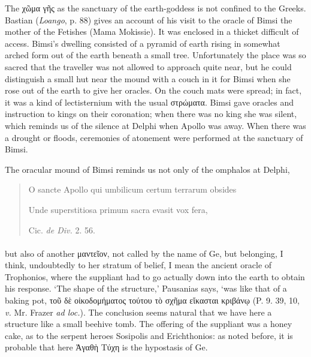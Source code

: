\documentclass[a4paper, 11pt, oneside, polutonikogreek, english]{article}
\begin{document}
The χῶμα γῆς as the sanctuary of the earth-goddess is not confined to the Greeks. Bastian (\emph{Loango}, p. 88) gives an account of his visit to the oracle of Bimsi the mother of the Fetishes (Mama Mokissie). It was enclosed in a thicket difficult of access. Bimsi's dwelling consisted of a pyramid of earth rising in somewhat arched form out of the earth beneath a small tree. Unfortunately the place was so sacred that the traveller was not allowed to approach quite near, but he could distinguish a small hut near the mound with a couch in it for Bimsi when she rose out of the earth to give her oracles. On the couch mats were spread; in fact, it was a kind of lectisternium with the usual στρώματα. Bimsi gave oracles and instruction to kings on their coronation; when there was no king she was silent, which reminds us of the silence at Delphi when Apollo was away. When there was a drought or floods, ceremonies of atonement were performed at the sanctuary of Bimsi.

The oracular mound of Bimsi reminds us not only of the omphalos at Delphi,
\begin{quotation}
O sancte Apollo qui umbilicum certum terrarum obsides

Unde superstitiosa primum sacra evasit vox fera,

\hspace*{20mm}Cic. \emph{de Div.} 2. 56.
\end{quotation}
\paragraph{}
but also of another μαντεῖον, not called by the name of Ge, but belonging, I think, undoubtedly to her stratum of belief, I mean the ancient oracle of Trophonios, where the suppliant had to go actually down into the earth to obtain his response. `The shape of the structure,' Pausanias says, `was like that of a baking pot, τοῦ δὲ οἰκοδομήματος τούτου τὸ σχῆμα εἴκασται κριβάνῳ (P. 9. 39, 10, \emph{v.} Mr. Frazer \emph{ad loc.}). The conclusion seems natural that we have here a structure like a small beehive tomb. The offering of the suppliant was a honey cake, as to the serpent heroes Sosipolis and Erichthonios: as noted before, it is probable that here Ἀγαθὴ Τύχη is the hypostasis of Ge.
\end{document}
